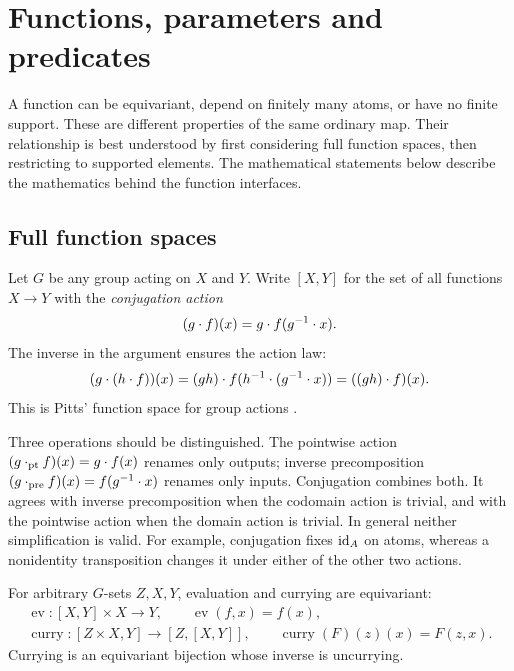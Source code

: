 \section{Functions, parameters and predicates}
\label{sec:functions}

A function can be equivariant, depend on finitely many atoms, or have no
finite support. These are different properties of the same ordinary map.
Their relationship is best understood by first considering full function
spaces, then restricting to supported elements. The mathematical statements
below describe the mathematics behind the function interfaces.

\subsection{Full function spaces}
\label{sec:full-function-spaces}

Let $G$ be any group acting on $X$ and $Y$. Write $[X,Y]$ for the set of
all functions $X\to Y$ with the \emph{conjugation action}
\begin{equation}
  (g\mathbin{\cdot} f)(x)=g\mathbin{\cdot} f(g^{-1}\mathbin{\cdot} x).
  \label{eq:function-conjugation}
\end{equation}
The inverse in the argument ensures the action law:
\[
  (g\mathbin{\cdot}(h\mathbin{\cdot} f))(x)
    =(gh)\mathbin{\cdot} f(h^{-1}\mathbin{\cdot}(g^{-1}\mathbin{\cdot} x))
    =((gh)\mathbin{\cdot} f)(x).
\]
This is Pitts' function space for group actions
\cite[Section~1.4, equation~(1.24), p.~18]{pitts2013}.

Three operations should be distinguished. The pointwise action
$(g\mathbin{\cdot}_{\mathrm{pt}}f)(x)=g\mathbin{\cdot} f(x)$ renames only outputs;
inverse precomposition $(g\mathbin{\cdot}_{\mathrm{pre}}f)(x)=f(g^{-1}\mathbin{\cdot} x)$
renames only inputs. Conjugation combines both. It agrees with inverse
precomposition when the codomain action is trivial, and with the pointwise
action when the domain action is trivial. In general neither simplification
is valid. For example, conjugation fixes $\operatorname{id}_A$ on atoms, whereas a
nonidentity transposition changes it under either of the other two actions.

\begin{proposition}
\label{prop:function-evaluation-curry}
For arbitrary $G$-sets $Z,X,Y$, evaluation and currying are equivariant:
\begin{gather*}
  \operatorname{ev}:[X,Y]\times X\longrightarrow Y,
  \qquad \operatorname{ev}(f,x)=f(x),\\
  \operatorname{curry}:[Z\times X,Y]\longrightarrow[Z,[X,Y]],
  \qquad \operatorname{curry}(F)(z)(x)=F(z,x).
\end{gather*}
Currying is an equivariant bijection whose inverse is uncurrying.
\end{proposition}


